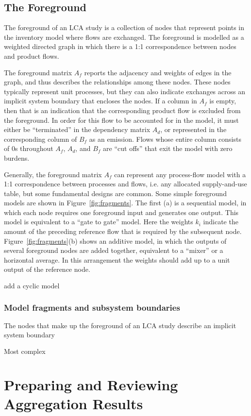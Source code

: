 \subsection{The Foreground}

The foreground of an LCA study is a collection of nodes that represent points in the inventory model where flows are exchanged.  The foreground is modelled as a weighted directed graph in which there is a 1:1 correspondence between nodes and product flows.

The foreground matrix $A_f$ reports the adjacency and weights of edges in the graph, and thus describes the relationships among these nodes.  These nodes typically represent unit processes, but they can also indicate exchanges across an implicit system boundary that encloses the nodes.  If a column in $A_f$ is empty, then that is an indication that the corresponding product flow is excluded from the foreground.  In order for this flow to be accounted for in the model, it must either be ``terminated'' in the dependency matrix $A_d$, or represented in the corresponding column of $B_f$ as an emission.  Flows whose entire column consists of 0s throughout $A_f$, $A_d$, and $B_f$ are ``cut offs'' that exit the model with zero burdens.




Generally, the foreground matrix $A_f$ can represent any process-flow model with a 1:1 correspondence between processes and flows, i.e. any allocated supply-and-use table, but some fundamental designs are common.  Some simple foreground models are shown in Figure~\ref{fig:fragments}.  The first (a) is a sequential model, in which each node requires one foreground input and generates one output. This model is equivalent to a ``gate to gate'' model.  Here the weights $k_i$ indicate the amount of the preceding reference flow that is required by the subsequent node.  Figure~\ref{fig:fragments}(b) shows an additive model, in which the outputs of several foreground nodes are added together, equivalent to a ``mixer'' or a horizontal average.  In this arrangement the weights %
should add up to a unit output of the reference node.

add a cyclic model


\subsubsection{Model fragments and subsystem boundaries}


The nodes that make up the foreground of an LCA study describe an implicit system boundary

Most complex


\section{Preparing and Reviewing Aggregation Results}

